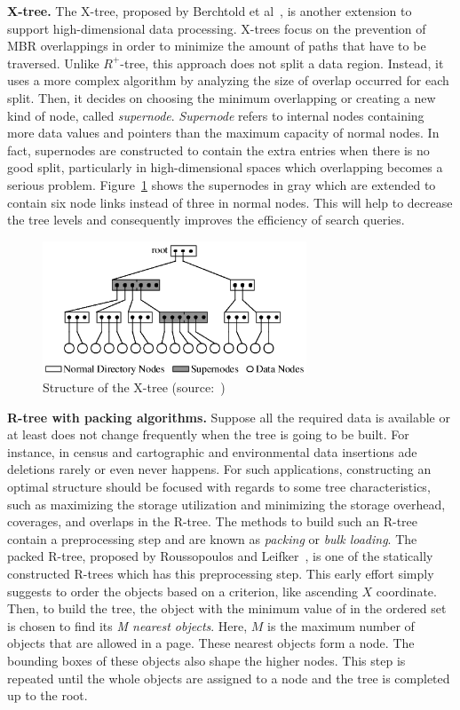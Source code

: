 \documentclass[a4paper,12pt]{article}
\begin{document}
\textbf{X-tree.}
The X-tree, proposed by Berchtold et al~\cite{xtree}, is another extension to support high-dimensional data processing. X-trees focus on the prevention of MBR overlappings in order to minimize the amount of paths that have to be traversed. Unlike $R^+$-tree, this approach does not split a data region. Instead, it uses a more complex algorithm by analyzing the size of overlap occurred for each split. Then, it decides on choosing the minimum overlapping or creating a new kind of node, called \textit{supernode}. \textit{Supernode} refers to internal nodes containing more data values and pointers than the maximum capacity of normal nodes. In fact, supernodes are constructed to contain the extra entries when there is no good split, particularly in high-dimensional spaces which overlapping becomes a serious problem. Figure~\ref{figxtree} shows the supernodes in gray which are extended to contain six node links instead of three in normal nodes. This will help to decrease the tree levels and consequently improves the efficiency of search queries.

\begin{figure}
\centering
\includegraphics[width=0.7\textwidth]{xtree}
\caption{Structure of the X-tree (source:~\cite{xtree})}
\label{figxtree}
\end{figure}


\textbf{R-tree with packing algorithms.}
Suppose all the required data is available or at least does not change frequently when the tree is going to be built. For instance, in census and cartographic and environmental data insertions ade deletions rarely or even never happens. 
For such applications, constructing an optimal structure should be focused with regards to some tree characteristics, such as maximizing the storage utilization and minimizing the storage overhead, coverages, and overlaps in the R-tree. The methods to build such an R-tree contain a preprocessing step and are known as \textit{packing} or \textit{bulk loading}. 
The packed R-tree, proposed by Roussopoulos and Leifker~\cite{packedrtree, packedrtree2}, is one of the statically constructed R-trees which has this preprocessing step. This early effort simply suggests to order the objects based on a criterion, like ascending $X$ coordinate. Then, to build the tree, the object with the minimum value of in the ordered set is chosen to find its \textit{M nearest objects}. Here, $M$ is the maximum number of objects that are allowed in a page. These nearest objects form a node. The bounding boxes of these objects also shape the higher nodes. This step is repeated until the whole objects are assigned to a node and the tree is completed up to the root.
\end{document}
